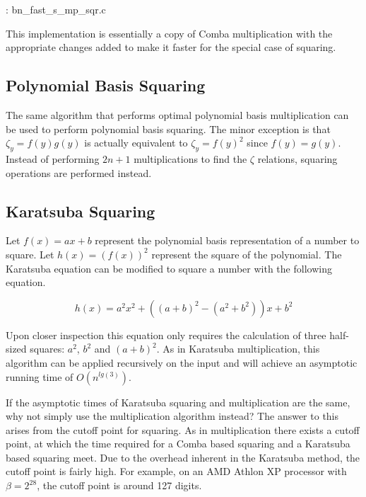 \documentclass[b5paper]{book}
\begin{document}
\vspace{+3mm}\begin{small}
\hspace{-5.1mm}{\bf File}: bn\_fast\_s\_mp\_sqr.c
\vspace{-3mm}
\begin{alltt}
\end{alltt}
\end{small}

This implementation is essentially a copy of Comba multiplication with the appropriate changes added to make it faster for 
the special case of squaring.  

\subsection{Polynomial Basis Squaring}
The same algorithm that performs optimal polynomial basis multiplication can be used to perform polynomial basis squaring.  The minor exception
is that $\zeta_y = f(y)g(y)$ is actually equivalent to $\zeta_y = f(y)^2$ since $f(y) = g(y)$.  Instead of performing $2n + 1$
multiplications to find the $\zeta$ relations, squaring operations are performed instead.  

\subsection{Karatsuba Squaring}
Let $f(x) = ax + b$ represent the polynomial basis representation of a number to square.  
Let $h(x) = \left ( f(x) \right )^2$ represent the square of the polynomial.  The Karatsuba equation can be modified to square a 
number with the following equation.

\begin{equation}
h(x) = a^2x^2 + \left ((a + b)^2 - (a^2 + b^2) \right )x + b^2
\end{equation}

Upon closer inspection this equation only requires the calculation of three half-sized squares: $a^2$, $b^2$ and $(a + b)^2$.  As in 
Karatsuba multiplication, this algorithm can be applied recursively on the input and will achieve an asymptotic running time of 
$O \left ( n^{lg(3)} \right )$.

If the asymptotic times of Karatsuba squaring and multiplication are the same, why not simply use the multiplication algorithm 
instead?  The answer to this arises from the cutoff point for squaring.  As in multiplication there exists a cutoff point, at which the 
time required for a Comba based squaring and a Karatsuba based squaring meet.  Due to the overhead inherent in the Karatsuba method, the cutoff 
point is fairly high.  For example, on an AMD Athlon XP processor with $\beta = 2^{28}$, the cutoff point is around 127 digits.  
\end{document}
